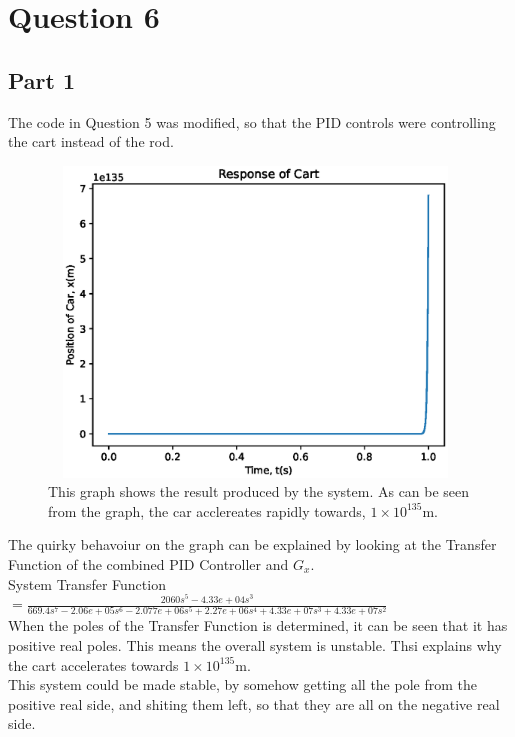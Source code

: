 \documentclass[a4paper,10pt,reqno]{article}
\numberwithin{equation}{section}
\begin{document}
\newpage
\section{Question 6}
\subsection{Part 1}
The code in Question 5 was modified, so that the PID controls were controlling the cart instead of the rod.
\begin{figure}[H]
\centering
\includegraphics[width=11cm, height=8.25cm]{Response_Cart.eps}
\caption
{This graph shows the result produced by the system. As can be seen from the graph, the car acclereates rapidly towards, $1 \times 10^{135}$m.}
\end{figure}

\noindent
The quirky behavoiur on the graph can be explained by looking at the Transfer Function of the combined PID Controller and $G_x$. \\

\noindent
System Transfer Function $ = \frac{2060 s^5 - 4.33e+04 s^3}{669.4 s^7 - 2.06e+05 s^6 - 2.077e+06 s^5 + 2.27e+06 s^4 + 4.33e+07 s^3 + 4.33e+07 s^2}$\\

\noindent
When the poles of the Transfer Function is determined, it can be seen that it has positive real poles. This means the overall system is unstable. Thsi explains why the cart accelerates towards $1 \times 10^{135}$m.\\
This system could be made stable, by somehow getting all the pole from the positive real side, and shiting them left, so that they are all on the negative real side.

\newpage
\end{document}
